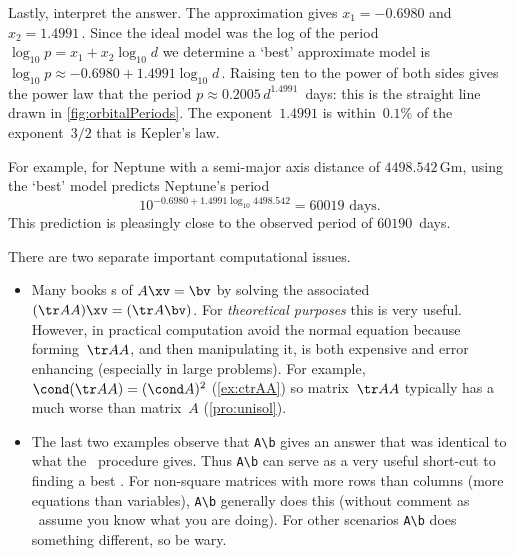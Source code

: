 \begin{example}
\begin{solution}
Lastly, interpret the answer.
The approximation gives \(x_1=-0.6980\) and \(x_2=1.4991\)\,.  
Since the ideal model was the log of the period \(\log_{10}p=x_1+x_2\log_{10}d\) we determine a `best' approximate model is \(\log_{10}p\approx-0.6980+1.4991\log_{10}d\)\,. 
Raising ten to the power of both sides gives the power law that the period \(p\approx0.2005\,d^{1.4991}\)~days: this is the straight line drawn in \autoref{fig:orbitalPeriods}.
The exponent~\(1.4991\) is within~\(0.1\)\% of the exponent~\(3/2\) that is Kepler's law.

For example, for Neptune with a semi-major axis distance of \(4498.542\)\,Gm, using the `best' model predicts Neptune's period\[10^{-0.6980+1.4991\log_{10}4498.542}=60019\text{ days.}\]
This prediction is pleasingly close to the observed period of \(60190\)~days.
\end{solution}
\end{example}





\begin{compute}
There are two separate important computational issues.
\begin{itemize}
\item Many books s of \(A\xv=\bv\) by solving the associated  \((\tr AA)\xv=(\tr A\bv)\).  
For \emph{theoretical purposes} this  is very useful.  
However, in practical computation avoid the normal equation because forming~\(\tr AA\), and then manipulating it, is both expensive and error enhancing (especially in large problems).
For example, \(\cond(\tr AA)=(\cond A)^2\) (\autoref{ex:ctrAA}) so matrix~\(\tr AA\) typically has a much worse  than matrix~\(A\) (\autoref{pro:unisol}).

\item The last two examples observe that \verb|A\b| gives an answer that was identical to what the \svd\ procedure gives.
Thus \verb|A\b| can serve as a very useful short-cut to finding a best .
For non-square matrices with more rows than columns (more equations than variables), \verb|A\b| generally does this (without comment as \script\ assume you know what you are doing).
For other scenarios \verb|A\b| does something different, so be wary.
\end{itemize}
\end{compute}



